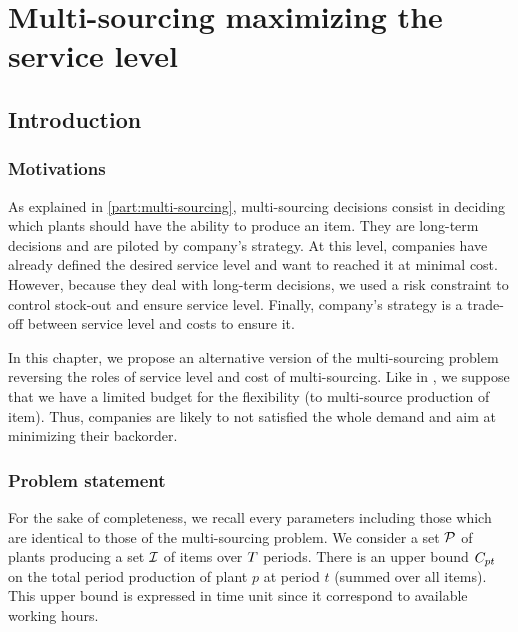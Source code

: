 \chapter{Multi-sourcing maximizing the service level}



\section{Introduction}


\subsection{Motivations}


As explained in \cref{part:multi-sourcing}, multi-sourcing decisions consist in deciding which plants should have the ability to produce an item.
They are long-term decisions and are piloted by company's strategy.
At this level, companies have already defined the desired service level and want to reached it at minimal cost.
However, because they deal with long-term decisions, we used a risk constraint to control stock-out and ensure service level.
Finally, company's strategy is a trade-off between service level and costs to ensure it.


In this chapter, we propose an alternative version of the multi-sourcing problem reversing the roles of service level and cost of multi-sourcing.
Like in \citet{}, we suppose that we have a limited budget for the flexibility (\ie to multi-source production of item).
Thus, companies are likely to not satisfied the whole demand and aim at minimizing their backorder.



\subsection{Problem statement}


For the sake of completeness, we recall every parameters including those which are identical to those of the multi-sourcing problem.
We consider a set $\mathcal{P}$ of plants producing a set $\mathcal{I}$ of items over $T$ periods.
There is an upper bound $C_{pt}$ on the total period production of plant $p$ at period $t$ (summed over all items).
This upper bound is expressed in time unit since it correspond to available working hours.


